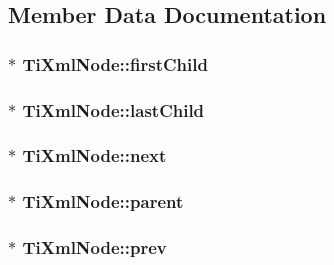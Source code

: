 \subsection{Member Data Documentation}
\hypertarget{class_ti_xml_node_af749fb7f22010b80e8f904c32653d50e}{
\subsubsection[{first\-Child}]{$\ast$ Ti\-Xml\-Node\-::first\-Child\hspace{0.3cm}{\ttfamily [protected]}}}\label{class_ti_xml_node_af749fb7f22010b80e8f904c32653d50e}
\hypertarget{class_ti_xml_node_a5b30756d21b304580d22a841ec9d61f8}{
\subsubsection[{last\-Child}]{$\ast$ Ti\-Xml\-Node\-::last\-Child\hspace{0.3cm}{\ttfamily [protected]}}}\label{class_ti_xml_node_a5b30756d21b304580d22a841ec9d61f8}
\hypertarget{class_ti_xml_node_a2f329cc993d2d34df76e17dcbb776b45}{
\subsubsection[{next}]{$\ast$ Ti\-Xml\-Node\-::next\hspace{0.3cm}{\ttfamily [protected]}}}\label{class_ti_xml_node_a2f329cc993d2d34df76e17dcbb776b45}
\hypertarget{class_ti_xml_node_a662c4de61244e4fa5bd4e2d8c63143a5}{
\subsubsection[{parent}]{$\ast$ Ti\-Xml\-Node\-::parent\hspace{0.3cm}{\ttfamily [protected]}}}\label{class_ti_xml_node_a662c4de61244e4fa5bd4e2d8c63143a5}
\hypertarget{class_ti_xml_node_a9c5370ea2cbfd9f0e0f7b30a57fd68f5}{
\subsubsection[{prev}]{$\ast$ Ti\-Xml\-Node\-::prev\hspace{0.3cm}{\ttfamily [protected]}}}\label{class_ti_xml_node_a9c5370ea2cbfd9f0e0f7b30a57fd68f5}
